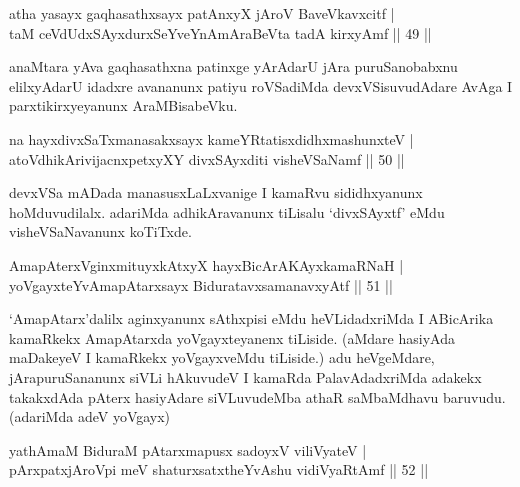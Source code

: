 
\begin{shl}
atha yasayx gaqhasathxsayx patAnxyX jAroV BaveVkavxcitf | \\
taM ceVdUdxSAyxdurxSeYveYnAmAraBeVta tadA kirxyAmf \hfill|| 49 || 
\end{shl}

\begin{artha}
anaMtara yAva gaqhasathxna patinxge yArAdarU jAra puruSanobabxnu elilxyAdarU idadxre avananunx patiyu roVSadiMda devxVSisuvudAdare AvAga I parxtikirxyeyanunx AraMBisabeVku.
\end{artha}


\begin{shl}
na hayxdivxSaTxmanasakxsayx kameYRtatisxdidhxmashunxteV | \\
atoV\s dhikArivijacnxpetxyXY divxSAyxditi visheVSaNamf \hfill|| 50 || 
\end{shl}

\begin{artha}
devxVSa mADada manasusxLaLxvanige I kamaRvu sididhxyanunx hoMduvudilalx. adariMda adhikAravanunx tiLisalu `divxSAyxtf' eMdu visheVSaNavanunx koTiTxde.
\end{artha}


\begin{shl}
AmapAterxV\s ginxmituyxkAtxyX hayxBicArAKAyxkamaRNaH | \\
yoVgayxteYvA\s \s mapAtarxsayx BiduratavxsamanavxyAtf \hfill|| 51 || 
\end{shl}

\begin{artha}
`AmapAtarx'dalilx aginxyanunx sAthxpisi eMdu heVLidadxriMda I ABicArika kamaRkekx AmapAtarxda yoVgayxteyanenx tiLiside. (aMdare hasiyAda maDakeyeV I kamaRkekx yoVgayxveMdu tiLiside.) adu heVgeMdare, jArapuruSananunx siVLi hAkuvudeV I kamaRda PalavAdadxriMda adakekx takakxdAda pAterx hasiyAdare siVLuvudeMba athaR saMbaMdhavu baruvudu. (adariMda adeV yoVgayx)
\end{artha}


\begin{shl}
yathA\s \s maM BiduraM pAtarxmapusx sadoyxV viliVyateV | \\
pArxpatxjAroV\s pi meV shaturxsatxtheYvA\s \s shu vidiVyaRtAmf \hfill|| 52 || 
\end{shl}


